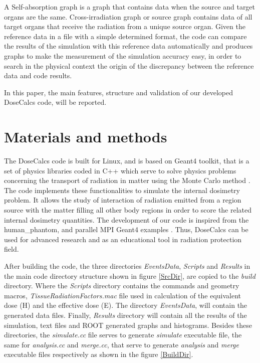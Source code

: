 \documentclass[letterpaper,12pt]{article}
\begin{document}
A Self-absorption graph is a graph that contains data when the source and target organs are the same. Cross-irradiation graph or source graph contains data of all target organs that receive the radiation from a unique source organ. Given the reference data in a file with a simple determined format, the code can compare the results of the simulation with this reference data automatically and produces graphs to make the measurement of the simulation accuracy easy, in order to search in the physical context the origin of the discrepancy between the reference data and code results.

In this paper, the main features, structure and validation of our developed DoseCalcs code, will be reported.

\section{Materials and methods}

The DoseCalcs code is built for Linux, and is based on Geant4 toolkit, that is a set of physics libraries coded in C++ which serve to solve physics problems concerning the transport of radiation in matter using the Monte Carlo method \cite{ExplorMonteCarlo}. The code implements these functionalities to simulate the internal dosimetry problem. It allows the study of interaction of radiation emitted from a region source with the matter filling all other body regions in order to score the related internal dosimetry quantities. The development of our code is inspired from the human\_phantom, and parallel MPI Geant4 examples \cite{G4HumanPhantom, G4MPI}. Thus, DoseCalcs can be used for advanced research and as an educational tool in radiation protection field.

After building the code, the three directories \textit{EventsData}, \textit{Scripts} and \textit{Results} in the main code directory structure shown in figure \ref{SrcDir}, are copied to the \textit{build} directory. Where the \textit{Scripts} directory contains the commands and geometry macros, \textit{TissueRadiationFactors.mac} file used in calculation of the equivalent dose (H) and the effective dose (E). The directory \textit{EventsData}, will contain the generated data files. Finally, \textit{Results} directory will contain all the results of the simulation, text files and ROOT generated graphs and histograms. Besides these directories, the \textit{simulate.cc} file serves to generate \textit{simulate} executable file, the same for \textit{analysis.cc} and \textit{merge.cc}, that serve to generate \textit{analysis} and \textit{merge} executable files respectively as shown in the figure \ref{BuildDir}. 
\end{document}
